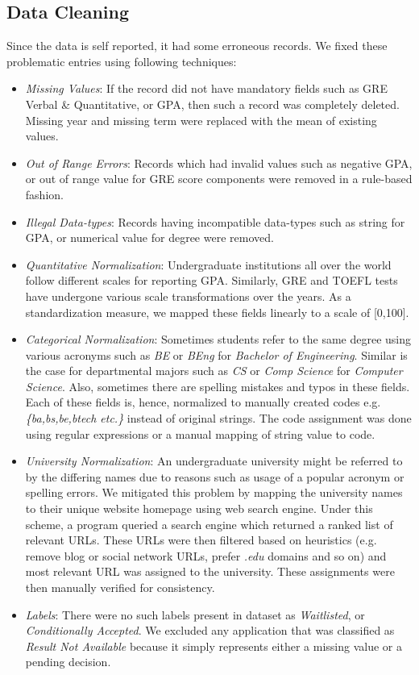 \documentclass{sig-alternate-05-2015}
\begin{document}
\subsection{Data Cleaning}
\label{subsec:dataset-cleaning}
Since the data is self reported, it had some erroneous records. We fixed these problematic entries using following techniques:
\begin{itemize}
\item \textit{Missing Values}: If the record did not have mandatory fields such as GRE Verbal \& Quantitative, or GPA, then such a record was completely deleted. Missing year and missing term were replaced with the mean of existing values.
\item \textit{Out of Range Errors}: Records which had invalid values such as negative GPA, or out of range value for GRE score components were removed in a rule-based fashion.
\item \textit{Illegal Data-types}: Records having incompatible data-types such as string for GPA, or numerical value for degree were removed.
\item \textit{Quantitative Normalization}: Undergraduate institutions all over the world follow different scales for reporting GPA. Similarly, GRE and TOEFL tests have undergone various scale transformations over the years. As a standardization measure, we mapped these fields linearly to a scale of [0,100].
\item \textit{Categorical Normalization}: Sometimes students refer to the same degree using various acronyms such as \textit{BE} or \textit{BEng} for \textit{Bachelor of Engineering}. Similar is the case for departmental majors such as \textit{CS} or \textit{Comp Science} for \textit{Computer Science}. Also, sometimes there are spelling mistakes and typos in these fields. Each of these fields is, hence, normalized to manually created codes e.g. \textit{\{ba,bs,be,btech etc.\}} instead of original strings. The code assignment was done using regular expressions or a manual mapping of string value to code.
\item \textit{University Normalization}: An undergraduate university might be referred to by the differing names due to reasons such as usage of a popular acronym or spelling errors. We mitigated this problem by mapping the university names to their unique website homepage using web search engine. Under this scheme, a program queried a search engine which returned a ranked list of relevant URLs. These URLs were then filtered based on heuristics (e.g. remove blog or social network URLs, prefer \textit{.edu} domains and so on) and most relevant URL was assigned to the university. These assignments were then manually verified for consistency.
\item \textit{Labels}: There were no such labels present in dataset as \textit{Waitlisted}, or \textit{Conditionally Accepted}. We excluded any application that was classified as \textit{Result Not Available} because it simply represents either a missing value or a pending decision.
\end{itemize}
\end{document}
